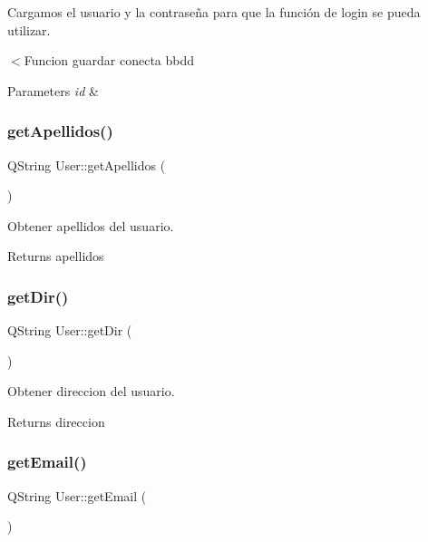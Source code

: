 Cargamos el usuario y la contraseña para que la función de login se pueda utilizar. 

$<$Funcion guardar conecta bbdd


\begin{DoxyParams}{Parameters}
{\em id} & \\
\hline
\end{DoxyParams}
\mbox{\label{classUser_abe1cf0f201fe92b0d0f4540689477bd4}} 
\subsubsection{\texorpdfstring{get\+Apellidos()}{getApellidos()}}
{\footnotesize\ttfamily Q\+String User\+::get\+Apellidos (\begin{DoxyParamCaption}{ }\end{DoxyParamCaption})}



Obtener apellidos del usuario. 

\begin{DoxyReturn}{Returns}
apellidos 
\end{DoxyReturn}
\mbox{\label{classUser_a1bbfd504de0babb6591de36bc7994673}} 
\subsubsection{\texorpdfstring{get\+Dir()}{getDir()}}
{\footnotesize\ttfamily Q\+String User\+::get\+Dir (\begin{DoxyParamCaption}{ }\end{DoxyParamCaption})}



Obtener direccion del usuario. 

\begin{DoxyReturn}{Returns}
direccion 
\end{DoxyReturn}
\mbox{\label{classUser_ad6ef2b0be0450bdc6ac2c01ed7c8d9ca}} 
\subsubsection{\texorpdfstring{get\+Email()}{getEmail()}}
{\footnotesize\ttfamily Q\+String User\+::get\+Email (\begin{DoxyParamCaption}{ }\end{DoxyParamCaption})}



